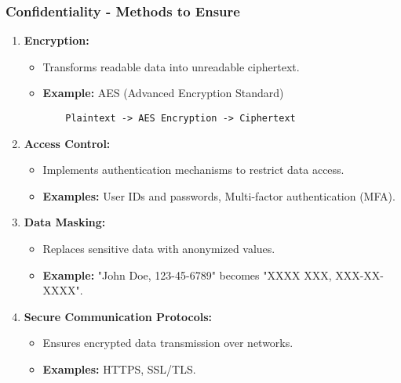 \documentclass{beamer}
\begin{document}
\begin{frame}[fragile]
    \frametitle{Confidentiality - Methods to Ensure}
    \begin{enumerate}
        \item \textbf{Encryption:}
        \begin{itemize}
            \item Transforms readable data into unreadable ciphertext.
            \item \textbf{Example:} AES (Advanced Encryption Standard)
            \begin{lstlisting}
    Plaintext -> AES Encryption -> Ciphertext
            \end{lstlisting}
        \end{itemize}
        
        \item \textbf{Access Control:} 
        \begin{itemize}
            \item Implements authentication mechanisms to restrict data access.
            \item \textbf{Examples:} User IDs and passwords, Multi-factor authentication (MFA).
        \end{itemize}
        
        \item \textbf{Data Masking:}
        \begin{itemize}
            \item Replaces sensitive data with anonymized values.
            \item \textbf{Example:} "John Doe, 123-45-6789" becomes "XXXX XXX, XXX-XX-XXXX".
        \end{itemize}
        
        \item \textbf{Secure Communication Protocols:}
        \begin{itemize}
            \item Ensures encrypted data transmission over networks.
            \item \textbf{Examples:} HTTPS, SSL/TLS.
        \end{itemize}
    \end{enumerate}
\end{frame}
\end{document}
